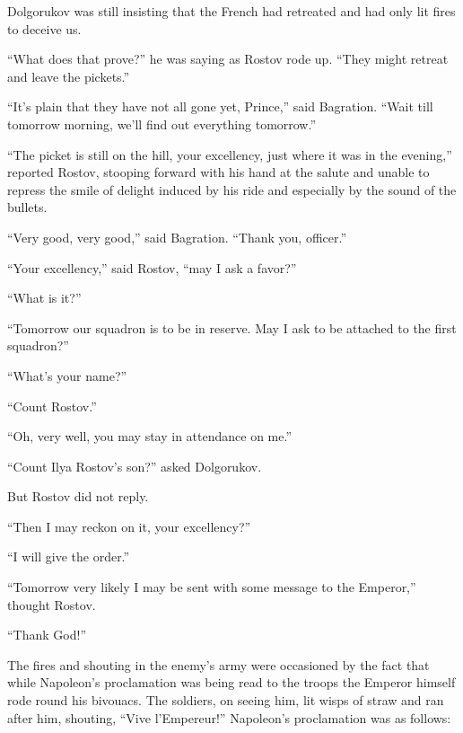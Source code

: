 Dolgorukov was still insisting that the French had retreated and
had only lit fires to deceive us.

``What does that prove?'' he was saying as Rostov rode up. ``They
might retreat and leave the pickets.''

``It's plain that they have not all gone yet, Prince,'' said
Bagration.  ``Wait till tomorrow morning, we'll find out
everything tomorrow.''

``The picket is still on the hill, your excellency, just where it
was in the evening,'' reported Rostov, stooping forward with his
hand at the salute and unable to repress the smile of delight
induced by his ride and especially by the sound of the bullets.

``Very good, very good,'' said Bagration. ``Thank you, officer.''

``Your excellency,'' said Rostov, ``may I ask a favor?''

``What is it?''

``Tomorrow our squadron is to be in reserve. May I ask to be
attached to the first squadron?''

``What's your name?''

``Count Rostov.''

``Oh, very well, you may stay in attendance on me.''

``Count Ilya Rostov's son?'' asked Dolgorukov.

But Rostov did not reply.

``Then I may reckon on it, your excellency?''

``I will give the order.''

``Tomorrow very likely I may be sent with some message to the
Emperor,'' thought Rostov.

``Thank God!''

The fires and shouting in the enemy's army were occasioned by the
fact that while Napoleon's proclamation was being read to the
troops the Emperor himself rode round his bivouacs. The soldiers,
on seeing him, lit wisps of straw and ran after him, shouting,
``Vive l'Empereur!''  Napoleon's proclamation was as follows:

